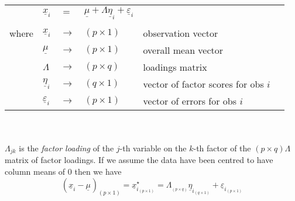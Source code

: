 \documentclass[a4paper,12pt,fleqn]{article}
\numberwithin{equation}{section}
\begin{document}
\noindent\begin{tabular}{l l l l l l}
& $\underline{x}_i$ & $=$ & $\underline{\mu} + \Lambda\underline{\eta}_i + \underline{\varepsilon}_i$&\\
	\\
	where  & $\underline{x}_i$ & $\rightarrow$ & $\left(p \times 1\right)$ & observation vector \\
	& $\underline{\mu}$ &  $\rightarrow$ & $\left(p \times 1\right)$  & overall mean vector \\
	& $\Lambda$ &  $\rightarrow$ & $\left(p \times q\right)$  & loadings matrix \\
	& $\underline{\eta}_i$ &  $\rightarrow$ & $\left(q \times 1\right)$  & vector of factor scores for obs $i$ \\
	& $\underline{\varepsilon}_i$ & $\rightarrow$ & $\left(p \times 1\right)$  & vector of errors for obs $i$ \\
\end{tabular}
\\ \\
$\Lambda_{jk}$ is the \textit{factor loading} of the $j$-th variable on the $k$-th factor of the $\left(p \times q\right) \Lambda$ matrix of factor loadings. If we assume the data have been centred to have column means of 0 then we have
\begin{equation}
\label{eq:1}
\left(\underline{x}_i - \underline{\mu}_{}\right)_{\left(p \times 1\right)} = \underline{x}_{i_{\left(p \times 1\right)}}^\star = \Lambda_{_{\left(p \times q\right)}}\underline{\eta}_{i_{\left(q \times 1\right)}} + \underline{\varepsilon}_{i_{\left(p \times 1\right)}}
\end{equation}
\end{document}
